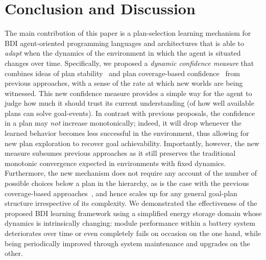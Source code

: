\section{Conclusion and Discussion}\label{sec:discussion}

The main contribution of this paper is a plan-selection learning mechanism for BDI agent-oriented programming languages and architectures that is able to \emph{adapt} when the dynamics of the environment in which the agent is situated changes over time.
Specifically, we proposed a \emph{dynamic confidence measure} that combines ideas of plan stability~\cite{airiau09:enhancing} and plan coverage-based confidence~\cite{singh10:extending,singh10:learning} from previous approaches, with a sense of the rate at which new worlds are being witnessed. This new confidence measure provides a simple way for the agent to judge how much it should trust its current understanding (of how well available plans can solve goal-events). 
In contrast with previous proposals, the confidence in a plan may \emph{not} increase monotonically; indeed, it will drop whenever the learned behavior becomes less successful in the environment, thus allowing for new plan exploration to recover goal achievability. 
%
Importantly, however, the new measure subsumes previous approaches as it still preserves the traditional monotonic convergence expected in environments with fixed dynamics.
%
Furthermore, the new mechanism does not require any account of the number of possible choices below a plan in the hierarchy, as is the case with the previous coverage-based approaches~\cite{singh10:extending,singh10:learning}, and hence scales up for any general goal-plan structure irrespective of its complexity. 
We demonstrated the effectiveness of the proposed BDI learning framework using a simplified energy storage domain whose dynamics is intrinsically changing: module performance within a battery system deteriorates over time or even completely fails on occasion on the one hand, while being periodically improved through system maintenance and upgrades on the other.  



